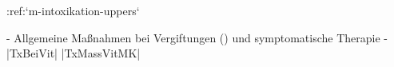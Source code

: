 :ref:`m-intoxikation-uppers`
\begin{itemize}
    -   Allgemeine Maßnahmen bei Vergiftungen
    () und
    symptomatische Therapie
    -   |TxBeiVit| |TxMassVitMK|
\end{itemize}